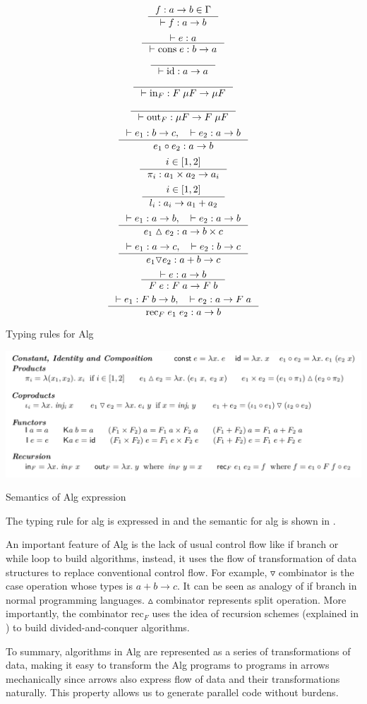 \begin{table}[ht]
    \[\inference{f : a -> b \in \Gamma}{|- f : a -> b}\]
    \[\inference{|- e : a}{|- \text{cons} \; e : b -> a}\]
    \[\inference{}{|- \text{id} : a -> a}\]
    \[\inference{}{|- \text{in}_F : F \; \mu F -> \mu F}\]
    \[\inference{}{|- \text{out}_F : \mu F -> F \; \mu F}\]
    \[\inference{|- e_1 : b -> c, \quad |- e_2 : a -> b}{e_1 \circ e_2: a -> b}\]
    \[\inference{i \in [1,2]}{\pi_i : a_1 \times a_2 -> a_i}\]
    \[\inference{i \in [1,2]}{l_i : a_i -> a_1 + a_2}\]
    \[\inference{|- e_1 : a -> b, \quad |- e_2 : a -> b}{e_1 \vartriangle e_2: a -> b \times c}\]
    \[\inference{|- e_1 : a -> c, \quad |- e_2 : b -> c}{e_1 \triangledown e_2: a + b -> c}\]
    \[\inference{|- e : a -> b}{F \; e : F \; a -> F \; b}\]
    \[\inference{|- e_1 : F \; b -> b, \quad |- e_2 : a -> F \; a}{\text{rec}_F \; e_1 \; e_2: a -> b}\]
    \caption{Typing rules for Alg}
    \label{project:typing}
\end{table}
\begin{table}[ht]
    \includegraphics[width=\textwidth]{project/semantics.png}
    \caption{Semantics of Alg expression} 
    \label{project:Semantics}
\end{table}

The typing rule for alg is expressed in  and the semantic for alg is shown in . 

An important feature of Alg is the lack of usual control flow like if branch or while loop to build algorithms, instead, it uses the flow of transformation of data structures to replace conventional control flow. For example, $\triangledown$ combinator is the case operation whose types is $a + b \rightarrow c$. It can be seen as analogy of if branch in normal programming languages. $\vartriangle$ combinator represents split operation. More importantly, the combinator $\text{rec}_F$ uses the idea of recursion schemes (explained in ) to build divided-and-conquer algorithms. 

To summary, algorithms in Alg are represented as a series of transformations of data, making it easy to transform the Alg programs to programs in arrows mechanically since arrows also express flow of data and their transformations naturally. This property allows us to generate parallel code without burdens.

